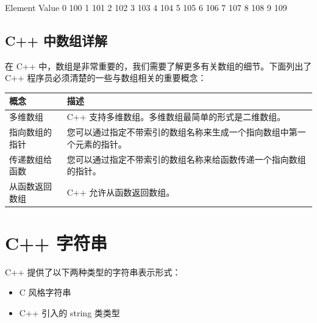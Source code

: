 \documentclass[
]{article}
\newenvironment{Shaded}{}{}
\newcommand{\DecValTok}[1]{\textcolor[rgb]{0.25,0.63,0.44}{#1}}
\newcommand{\NormalTok}[1]{#1}
\providecommand{\tightlist}{%
  \setlength{\itemsep}{0pt}\setlength{\parskip}{0pt}}
\begin{document}
\begin{Shaded}
\begin{Highlighting}[]
\NormalTok{Element        Value}
      \DecValTok{0}          \DecValTok{100}
      \DecValTok{1}          \DecValTok{101}
      \DecValTok{2}          \DecValTok{102}
      \DecValTok{3}          \DecValTok{103}
      \DecValTok{4}          \DecValTok{104}
      \DecValTok{5}          \DecValTok{105}
      \DecValTok{6}          \DecValTok{106}
      \DecValTok{7}          \DecValTok{107}
      \DecValTok{8}          \DecValTok{108}
      \DecValTok{9}          \DecValTok{109}
\end{Highlighting}
\end{Shaded}

\hypertarget{c-ux4e2dux6570ux7ec4ux8be6ux89e3}{%
\subsection{C++ 中数组详解}\label{c-ux4e2dux6570ux7ec4ux8be6ux89e3}}

在 C++ 中，数组是非常重要的，我们需要了解更多有关数组的细节。下面列出了
C++ 程序员必须清楚的一些与数组相关的重要概念：

\begin{longtable}[]{@{}ll@{}}
\toprule
概念 & 描述 \\
\midrule
\endhead
多维数组 & C++ 支持多维数组。多维数组最简单的形式是二维数组。 \\
指向数组的指针 &
您可以通过指定不带索引的数组名称来生成一个指向数组中第一个元素的指针。 \\
传递数组给函数 &
您可以通过指定不带索引的数组名称来给函数传递一个指向数组的指针。 \\
从函数返回数组 & C++ 允许从函数返回数组。 \\
\bottomrule
\end{longtable}

\hypertarget{c-ux5b57ux7b26ux4e32}{%
\section{C++ 字符串}\label{c-ux5b57ux7b26ux4e32}}

C++ 提供了以下两种类型的字符串表示形式：

\begin{itemize}
\tightlist
\item
  C 风格字符串
\item
  C++ 引入的 string 类类型
\end{itemize}
\end{document}
